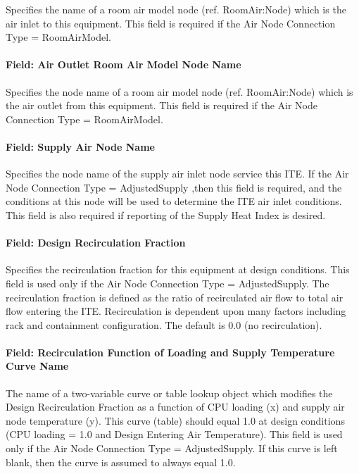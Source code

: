 Specifies the name of a room air model node (ref. RoomAir:Node) which is the air inlet to this equipment. This field is required if the Air Node Connection Type = RoomAirModel.

\paragraph{Field: Air Outlet Room Air Model Node Name}\label{field-air-outlet-room-air-model-node-name}

Specifies the node name of a room air model node (ref. RoomAir:Node) which is the air outlet from this equipment. This field is required if the Air Node Connection Type = RoomAirModel.

\paragraph{Field: Supply Air Node Name}\label{field-supply-air-node-name}

Specifies the node name of the supply air inlet node service this ITE. If the Air Node Connection Type = AdjustedSupply ,then this field is required, and the conditions at this node will be used to determine the ITE air inlet conditions. This field is also required if reporting of the Supply Heat Index is desired.

\paragraph{Field: Design Recirculation Fraction}\label{field-design-recirculation-fraction}

Specifies the recirculation fraction for this equipment at design conditions. This field is used only if the Air Node Connection Type = AdjustedSupply. The recirculation fraction is defined as the ratio of recirculated air flow to total air flow entering the ITE. Recirculation is dependent upon many factors including rack and containment configuration. The default is 0.0 (no recirculation).

\paragraph{Field: Recirculation Function of Loading and Supply Temperature Curve Name}\label{field-recirculation-function-of-loading-and-supply-temperature-curve-name}

The name of a two-variable curve or table lookup object which modifies the Design Recirculation Fraction as a function of CPU loading (x) and supply air node temperature (y). This curve (table) should equal 1.0 at design conditions (CPU loading = 1.0 and Design Entering Air Temperature). This field is used only if the Air Node Connection Type = AdjustedSupply. If this curve is left blank, then the curve is assumed to always equal 1.0.

